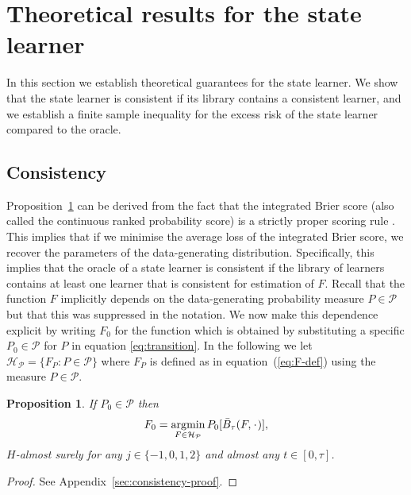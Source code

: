 \documentclass[a4paper,danish]{article}
\theoremstyle{plain} %
\numberwithin{theorem}{section}
\newtheorem{proposition}[theorem]{Proposition}
\theoremstyle{definition} %
\theoremstyle{remark}
\DeclareMathOperator{\E}{\mathbb{E}} %
\newcommand{\blank}{\makebox[1ex]{\textbf{$\cdot$}}}
\newcommand{\1}{\mathds{1}}
\DeclareMathOperator*{\argmin}{\arg\!\min}
\begin{document}
\section{Theoretical results for the state learner}
\label{sec:theor-results-prop}

In this section we establish theoretical guarantees for the
state learner. We show that the state learner is consistent if
its library contains a consistent learner, and we establish a
finite sample inequality for the excess risk of the state
learner compared to the oracle.

\subsection{Consistency}
\label{sec:consistency}

Proposition~\ref{prop:stric-prop} can be derived from the fact that the
integrated Brier score (also called the continuous ranked probability score) is
a strictly proper scoring rule \citep{gneiting2007strictly}. This implies that
if we minimise the average loss of the integrated Brier score, we recover the
parameters of the data-generating distribution. Specifically, this implies that
the oracle of a state learner is consistent if the library of learners contains
at least one learner that is consistent for estimation of \( F \). Recall that
the function \(F\) implicitly depends on the data-generating probability measure
\(P\in\mathcal P\) but that this was suppressed in the notation. We now make
this dependence explicit by writing \(F_0\) for the function which is obtained
by substituting a specific \(P_0\in\mathcal{P}\) for \(P\) in equation
\eqref{eq:transition}. In the following we let
\( \mathcal{H}_{\mathcal{P}} = \{F_P : P \in \mathcal{P}\} \) where \( F_P \) is defined as in
equation~(\ref{eq:F-def}) using the measure \( P \in \mathcal{P} \).

\begin{proposition}
  \label{prop:stric-prop}
  If \(P_0\in\mathcal{P}\) then
  \begin{equation*}
    F_0 = \argmin_{F \in \mathcal{H}_{\mathcal{P}}} P_0{[\bar{B}_\tau(F, \blank)]},
  \end{equation*}
  \( H \)-almost surely for any \( j\in \{-1,0,1,2\} \) and almost any
  \( t \in [0, \tau]\).
\end{proposition}
\begin{proof}
  See Appendix~\ref{sec:consistency-proof}.
\end{proof}
\end{document}
